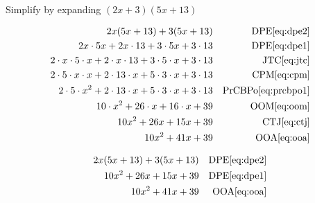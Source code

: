 \begin{example}[id:20141109-140659] \label{20141109-140659}  \hfill \\

Simplify by expanding $(2x+3)(5x+13)$

\soln

\solnsteps
\begin{align*}
2x(5x+13) + 3(5x+13) && \text{DPE} \eqref{eq:dpe2} \\	
2x \cdot 5x + 2x \cdot 13 + 3 \cdot 5x + 3 \cdot 13 && \text{DPE} \eqref{eq:dpe1} \\
2 \cdot x \cdot 5 \cdot x + 2 \cdot x \cdot 13 + 3 \cdot 5 \cdot x + 3 \cdot 13 && \text{JTC} \eqref{eq:jtc} \\
2 \cdot 5 \cdot x \cdot x + 2 \cdot 13 \cdot x + 5 \cdot 3 \cdot x + 3 \cdot 13  && \text{CPM} \eqref{eq:cpm} \\
2 \cdot 5 \cdot x^2 + 2 \cdot 13 \cdot x + 5 \cdot 3 \cdot x + 3 \cdot 13  && \text{PrCBPo} \eqref{eq:prcbpo1} \\
10 \cdot x^2 + 26 \cdot x + 16 \cdot x + 39  && \text{OOM} \eqref{eq:oom} \\
10x^2 + 26x + 15x + 39  && \text{CTJ} \eqref{eq:ctj} \\
10x^2 + 41x + 39  && \text{OOA} \eqref{eq:ooa} 
\end{align*}

\soln

\lesssteps
\begin{align*}
2x(5x+13) + 3(5x+13) && \text{DPE} \eqref{eq:dpe2} \\
10x^2+26x+15x+39 && \text{DPE} \eqref{eq:dpe1} \\
10x^2+41x+39 && \text{OOA} \eqref{eq:ooa} 
\end{align*}
\end{example}

